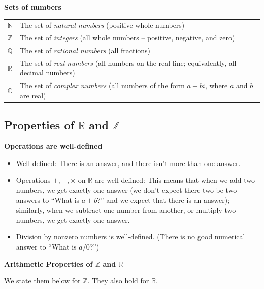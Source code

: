 \documentclass[11pt]{article}
\newcommand{\R}{\mathbb{R}}
\newcommand{\C}{\mathbb{C}}
\newcommand{\Q}{\mathbb{Q}}
\newcommand{\N}{\mathbb{N}}
\newcommand{\Z}{\mathbb{Z}}
\theoremstyle{definition}
\begin{document}
\vfill 

{\bf Sets of numbers}

\begin{tabular}{ll}
$\N$ & The set of {\em natural numbers} (positive whole numbers) \\
$\Z$ & The set of {\em integers} (all whole numbers -- positive, negative, and zero) \\
$\Q$ & The set of {\em rational numbers} (all fractions) \\
$\R$ & The set of {\em real numbers} (all numbers on the real line; equivalently, all decimal numbers) \\
$\C$ & The set of {\em complex numbers} (all numbers of the form $a+bi$, where $a$ and $b$ are real)
\end{tabular}


\newpage
\subsection{Properties of $\R$ and $\Z$} \label{s: properties of R and Z}

{\bf Operations are well-defined}
\vspace*{-4pt}
\begin{itemize}
\item[] Well-defined: There is an answer, and there isn't more than one answer.

\item[] Operations $+, -, \times$ on $\R$ are well-defined: This means that when we add two numbers, we get exactly one answer (we don't expect there two be two answers to ``What is $a+b$?'' and we expect that there is an answer); similarly, when we subtract one number from another, or multiply two numbers, we get exactly one answer.

\item[] Division by nonzero numbers is well-defined. (There is no good numerical answer to ``What is $a/0$?'')
\end{itemize}

{\bf Arithmetic Properties of $\Z$ and $\R$}

We state them below for $\Z$. They also hold for $\R$.
\end{document}
